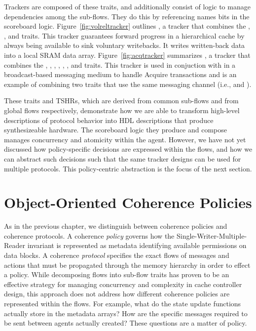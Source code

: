 Trackers are composed of these traits, and additionally consist of logic to manage dependencies among the sub-flows.
They do this by referencing names bits in the scoreboard logic.
Figure~\ref{fig:volreltracker} outlines , a tracker that combines the
, , and  traits.
This tracker guarantees forward progress in a hierarchical cache by always being available to sink voluntary writebacks.
It writes written-back data into a local SRAM data array.
Figure~\ref{fig:acqtracker} summarizes , a tracker that combines the
, , 
, , , ,
and  traits.
This tracker is used in conjuction with in a broadcast-based messaging medium to handle Acquire transactions
and is an example of combining two traits that use the same messaging channel (i.e.,
  and ).

These traits and TSHRs, which are derived from common sub-flows and from global flows respectively,
demonstrate how we are able to transform high-level descriptions of protocol behavior into HDL descriptions
that produce synthesizeable hardware.
The scoreboard logic they produce and compose manages concurrency and atomicity within the agent.
However, we have not yet discussed how policy-specific decisions are expressed within the flows,
and how we can abstract such decisions such that the same tracker designs can be used for multiple protocols.
This policy-centric abstraction is the focus of the next section.

\section{Object-Oriented Coherence Policies}

As in the previous chapter, we distinguish between coherence policies and coherence protocols.
A coherence {\em policy} governs how the Single-Writer-Multiple-Reader invariant is represented as metadata identifying available permissions on data blocks.
A coherence {\em protocol} specifies the exact flows of messages and actions that must be propagated through the memory hierarchy in order to effect a policy.
While decomposing flows into sub-flow traits has proven to be an effective strategy for managing concurrency and complexity in cache controller design,
this approach does not address how different coherence policies are represented within the flows.
For example, what do the state update functions actually store in the metadata arrays?
How are the specific messages required to be sent between agents actually created?
These questions are a matter of policy.

